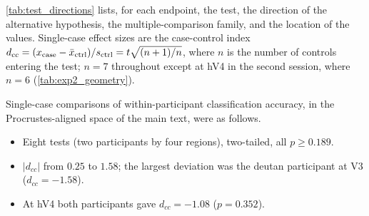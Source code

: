 \cref{tab:test_directions} lists, for each endpoint, the test, the direction of the alternative hypothesis, the multiple-comparison family, and the location of the values. Single-case effect sizes are the case-control index $d_{cc} = (x_{\rm case} - \bar{x}_{\rm ctrl}) / s_{\rm ctrl} = t\sqrt{(n+1)/n}$, where $n$ is the number of controls entering the test; $n = 7$ throughout except at hV4 in the second session, where $n = 6$ (\cref{tab:exp2_geometry}).

Single-case comparisons of within-participant classification accuracy, in the Procrustes-aligned space of the main text, were as follows.
\begin{itemize}
\item Eight tests (two participants by four regions), two-tailed, all $p \geq 0.189$.
\item $|d_{cc}|$ from $0.25$ to $1.58$; the largest deviation was the deutan participant at V3 ($d_{cc} = -1.58$).
\item At hV4 both participants gave $d_{cc} = -1.08$ ($p = 0.352$).
\end{itemize}

